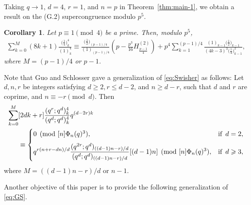\documentclass[12pt]{article}
\newtheorem{cor}[thm]{Corollary}
\numberwithin{equation}{section}
\begin{document}
Taking $q\to1$, $d=4$, $r=1$, and $n=p$ in Theorem~\ref{thm:main-1}, we obtain a result on the (G.2) supercongruence modulo $p^5$.
\begin{cor}
Let $p\equiv 1\pmod4$ be a prime. Then, modulo $p^5$,
    \begin{align*}
\sum_{k=0}^{M}(8k+1)\frac{\big(\tfrac14\big)_k^{4}}{(1)_k^{4}
}
\equiv
\frac{\big(\tfrac12\big)_{(p-1)/4}}{(1)_{(p-1)/4}}
\left(
p-\frac{p^{3}}{16}
H_{\frac{p-1}{4}}^{(2)}
\right)
+p^{4}
\sum_{k=1}^{(p-1)/4}
\frac{(1)_{k-1}\big(\tfrac12\big)_{k-1}}
{(4k-3)^{3}\big(\tfrac14\big)_{k-1}^{2}},
\end{align*}
where $M=(p-1)/4$ or $p-1$.
\end{cor} 
Note that Guo and Schlosser\cite{Guo-Scho} gave a generalization of \eqref{eq:Swisher} as follows:
Let $d,n,r$ be integers satisfying $d\geqslant2, r\leqslant d-2$, and $n\geqslant d-r$, such that $d$ and 
$r$ are coprime, and $n\equiv -r\pmod{d}$. Then
\begin{align}\label{eq:GS}
    \sum_{k=0}^{M}&[2dk+r]\frac{(q^r;q^d)^4_k}{(q^d;q^d)^4_k}q^{(d-2r)k}\nonumber\\
    &\equiv \begin{cases}
        0 \pmod{[n]\Phi_n(q)^3},   & \text{if} \hspace{0.5em}d=2,\\[6pt]
        \displaystyle
        q^{r(n+r-dn)/d}\frac{(q^{2r};q^d)_{((d-1)n-r)/d}}{(q^d;q^d)_{((d-1)n-r)/d}}[(d-1)n]\pmod{[n]\Phi_n(q)^3}, & \text{if} \hspace{0.5em}d\geqslant3,
    \end{cases}
\end{align}where $M=((d-1)n-r)/d$ or $n-1$.\par
Another objective of this paper is to provide the following generalization of \eqref{eq:GS}.
\end{document}

